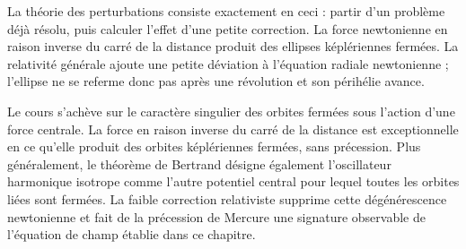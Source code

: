 La théorie des perturbations consiste exactement en ceci : partir d’un problème déjà résolu, puis calculer l’effet d’une petite correction. La force newtonienne en raison inverse du carré de la distance produit des ellipses képlériennes fermées. La relativité générale ajoute une petite déviation à l’équation radiale newtonienne ; l’ellipse ne se referme donc pas après une révolution et son périhélie avance.

Le cours s’achève sur le caractère singulier des orbites fermées sous l’action d’une force centrale. La force en raison inverse du carré de la distance est exceptionnelle en ce qu’elle produit des orbites képlériennes fermées, sans précession. Plus généralement, le théorème de Bertrand désigne également l’oscillateur harmonique isotrope comme l’autre potentiel central pour lequel toutes les orbites liées sont fermées. La faible correction relativiste supprime cette dégénérescence newtonienne et fait de la précession de Mercure une signature observable de l’équation de champ établie dans ce chapitre.